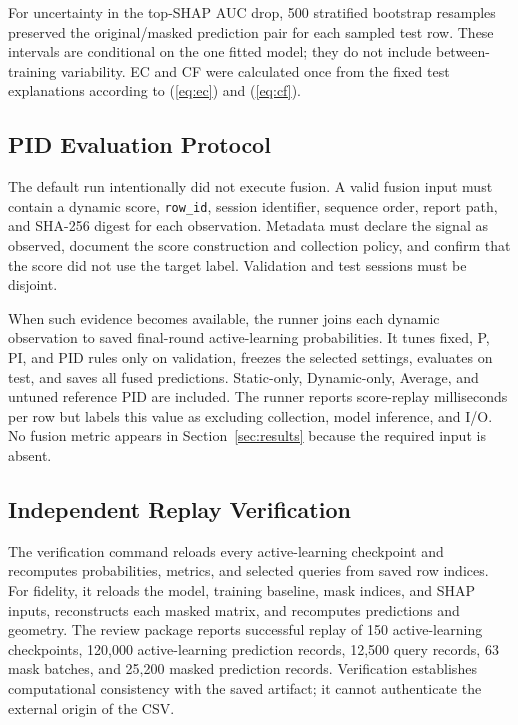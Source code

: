 For uncertainty in the top-SHAP AUC drop, 500 stratified bootstrap resamples
preserved the original/masked prediction pair for each sampled test row. These
intervals are conditional on the one fitted model; they do not include
between-training variability. EC and CF were calculated once from the fixed test
explanations according to (\ref{eq:ec}) and (\ref{eq:cf}).

\subsection{PID Evaluation Protocol}

The default run intentionally did not execute fusion. A valid fusion input must
contain a dynamic score, \texttt{row\_id}, session identifier, sequence order, report
path, and SHA-256 digest for each observation. Metadata must declare the signal
as observed, document the score construction and collection policy, and confirm
that the score did not use the target label. Validation and test sessions must be
disjoint.

When such evidence becomes available, the runner joins each dynamic observation
to saved final-round active-learning probabilities. It tunes fixed, P, PI, and
PID rules only on validation, freezes the selected settings, evaluates on test,
and saves all fused predictions. Static-only, Dynamic-only, Average, and untuned
reference PID are included. The runner reports score-replay milliseconds per row
but labels this value as excluding collection, model inference, and I/O. No
fusion metric appears in Section~\ref{sec:results} because the required input is
absent.

\subsection{Independent Replay Verification}

The verification command reloads every active-learning checkpoint and
recomputes probabilities, metrics, and selected queries from saved row indices.
For fidelity, it reloads the model, training baseline, mask indices, and SHAP
inputs, reconstructs each masked matrix, and recomputes predictions and geometry.
The review package reports successful replay of 150 active-learning checkpoints,
120,000 active-learning prediction records, 12,500 query records, 63 mask
batches, and 25,200 masked prediction records. Verification establishes
computational consistency with the saved artifact; it cannot authenticate the
external origin of the CSV.
